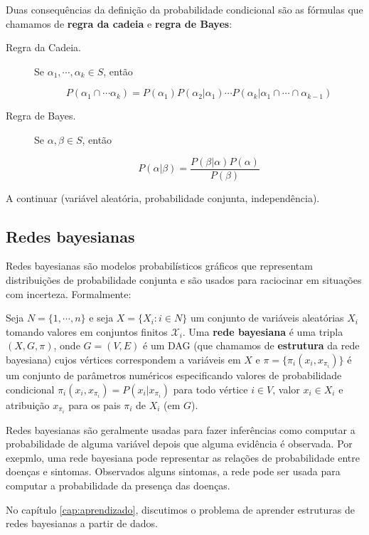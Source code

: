 Duas consequências da definição da probabilidade condicional são as fórmulas que chamamos de \textbf{regra da cadeia} e \textbf{regra de Bayes}:

\begin{description}
  \item[Regra da Cadeia.] Se $\alpha_1, \cdots, \alpha_k \in S$, então

    $$P(\alpha_1 \cap \cdots \alpha_k) = P(\alpha_1) P(\alpha_2 | \alpha_1) \cdots P(\alpha_k | \alpha_1 \cap \cdots \cap \alpha_{k-1})$$

  \item[Regra de Bayes.] Se $\alpha, \beta \in S$, então

    $$P(\alpha | \beta) = \frac{P(\beta | \alpha) P(\alpha)}{P(\beta)}$$
\end{description}

\vspace{2em}

A continuar (variável aleatória, probabilidade conjunta, independência).

\subsection{Redes bayesianas}

Redes bayesianas são modelos probabilísticos gráficos que representam distribuições de probabilidade conjunta e são usados para raciocinar em situações com incerteza. Formalmente:

\begin{definition}
  \cite{maua}
  Seja $N = \{ 1, \cdots, n \}$ e seja $X = \{X_i : i \in N\}$ um conjunto de variáveis aleatórias $X_i$ tomando valores em conjuntos finitos $\mathcal{X}_i$. Uma \textbf{rede bayesiana} é uma tripla $(X, G, \pi)$, onde $G = (V, E)$ é um DAG (que chamamos de \textbf{estrutura} da rede bayesiana) cujos vértices correspondem a variáveis em $X$ e $\pi = \{\pi_i(x_i, x_{\pi_i})\}$ é um conjunto de parâmetros numéricos especificando valores de probabilidade condicional $\pi_i(x_i, x_{\pi_i}) = P(x_i | x_{\pi_i})$ para todo vértice $i \in V$, valor $x_i \in X_i$ e atribuição $x_{\pi_i}$ para os pais $\pi_i$ de $X_i$ (em $G$).
\end{definition}

Redes bayesianas são geralmente usadas para fazer inferências como computar a probabilidade de alguma variável depois que alguma evidência é observada. Por exepmlo, uma rede bayesiana pode representar as relações de probabilidade entre doenças e sintomas. Observados alguns sintomas, a rede pode ser usada para computar a probabilidade da presença das doenças.

No capítulo \ref{cap:aprendizado}, discutimos o problema de aprender estruturas de redes bayesianas a partir de dados.

